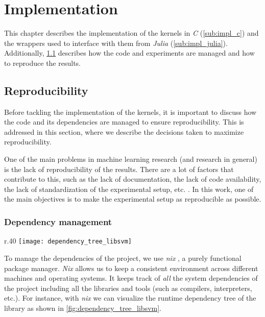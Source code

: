 \chapter{Implementation}
\label{sec:implementation}

This chapter describes the implementation of the kernels in \emph{C}
(\cref{sub:impl_c}) and the wrappers used to interface with them from
\emph{Julia} (\cref{sub:impl_julia}). Additionally, \cref{sec:reproducibility}
describes how the code and experiments are managed and how to reproduce the
results.

\section{Reproducibility}
\label{sec:reproducibility}

Before tackling the implementation of the kernels, it is important to discuss
how the code and its dependencies are managed to ensure reproducibility. This is
addressed in this section, where we describe the decisions taken to maximize
reproducibility.

One of the main problems in machine learning research (and research in general)
is the lack of reproducibility of the results. There are a lot of factors that
contribute to this, such as the lack of documentation, the lack of code
availability, the lack of standardization of the experimental setup, etc.
\cite{alstonBeginnerGuideConducting2021}. In this work, one of the main
objectives is to make the experimental setup as reproducible as possible.

\subsection{Dependency management}%
\label{sub:dependency_management}

\begin{wrapfigure}{r}{.40\textwidth}
    \texttt{[image: dependency\_tree\_libsvm]}
    \caption{\libsvm runtime dependencies.}
    \label{fig:dependency_tree_libsvm}
\end{wrapfigure}

To manage the dependencies of the project, we use \emph{nix}
\cite{NixNixOSReproducible}, a purely functional package manager. \emph{Nix}
allows us to keep a consistent environment across different machines and
operating systems. It keeps track of \emph{all} the system dependencies of the
project including all the libraries and tools (such as compilers, interpreters,
etc.). For instance, with \emph{nix} we can visualize the runtime dependency
tree of the \libsvm library as shown in \cref{fig:dependency_tree_libsvm}.

